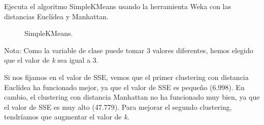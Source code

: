 \documentclass[a4paper, 11pt]{exam}
\begin{document}
\begin{questions}
	
{\question Ejecuta el algoritmo SimpleKMeans usando la herramienta Weka con las distancias Euclídea y Manhattan.}

\begin{figure}[h]
	\centering
	\qquad
	\caption{SimpleKMeans.}
	\label{Figura_3}
\end{figure}

Nota: Como la variable de clase puede tomar 3 valores diferentes, hemos elegido que el valor de \textit{k} sea igual a 3. 

Si nos fijamos en el valor de SSE, vemos que el primer clustering con distancia Euclídea ha funcionado mejor, ya que el valor de SSE es pequeño (6.998). En cambio, el clustering con distancia Manhattan no ha funcionado muy bien, ya que el valor de SSE es muy alto (47.779). Para mejorar el segundo clustering, tendríamos que augmentar el valor de \textit{k}.


\end{questions}
\end{document}
